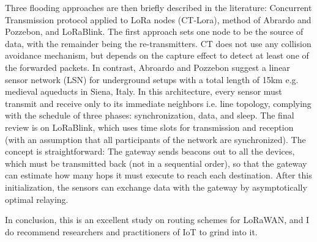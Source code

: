 \documentclass[12pt, a4paper, onside]{article}
\begin{document}
Three flooding approaches are then briefly described in the literature: Concurrent Transmission protocol applied to LoRa nodes (CT-Lora), method of Abrardo and Pozzebon, and LoRaBlink. The first approach sets one node to be the source of data, with the remainder being the re-transmitters. CT does not use any collision avoidance mechanism, but depends on the capture effect to detect at least one of the forwarded packets. In contrast, Abroardo and Pozzebon suggest a linear sensor network (LSN) for underground setups with a total length of 15km e.g. medieval aqueducts in Siena, Italy. In this architecture, every sensor must transmit and receive only to its immediate neighbors i.e. line topology, complying with the schedule of three phases: synchronization, data, and sleep. The final review is on LoRaBlink, which uses time slots for transmission and reception (with an assumption that all participants of the network are synchronized). The concept is straightforward: The gateway sends beacons out to all the devices, which must be transmitted back (not in a sequential order), so that the gateway can estimate how many hops it must execute to reach each destination. After this initialization, the sensors can exchange data with the gateway by asymptotically optimal relaying.

In conclusion, this is an excellent study on routing schemes for LoRaWAN, and I do recommend researchers and practitioners of IoT to grind into it.

\printbibliography
\end{document}
